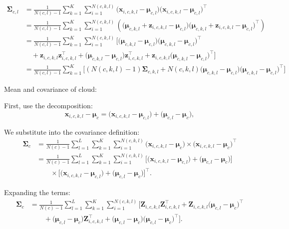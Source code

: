 \documentclass[journal]{IEEEtran}
\begin{document}
\begin{align*}
  \mathbf{\Sigma}_{c,l} &= \frac{1}{N(c,l)-1} \sum_{k=1}^K \sum_{i=1}^{N(c,k,l)} \big( \mathbf{x}_{i,c,k,l} - \mathbf{\mu}_{c,l} \big) \big( \mathbf{x}_{i,c,k,l} - \mathbf{\mu}_{c,l} \big)^\top \\
  &= \frac{1}{N(c,l)-1} \sum_{k=1}^K \sum_{i=1}^{N(c,k,l)} \left( \big( \mathbf{\mu}_{c,k,l} + \mathbf{z}_{i,c,k,l} - \mathbf{\mu}_{c,l} \big) \big( \mathbf{\mu}_{c,k,l} + \mathbf{z}_{i,c,k,l} - \mathbf{\mu}_{c,l} \big)^\top \right) \\
  &= \frac{1}{N(c,l)-1} \sum_{k=1}^K \sum_{i=1}^{N(c,k,l)} \Bigg[ \big( \mathbf{\mu}_{c,k,l} - \mathbf{\mu}_{c,l} \big) \big( \mathbf{\mu}_{c,k,l} - \mathbf{\mu}_{c,l} \big)^\top \\
  &\quad + \mathbf{z}_{i,c,k,l} \mathbf{z}_{i,c,k,l}^\top + \big( \mathbf{\mu}_{c,k,l} - \mathbf{\mu}_{c,l} \big) \mathbf{z}_{i,c,k,l}^\top + \mathbf{z}_{i,c,k,l} \big( \mathbf{\mu}_{c,k,l} - \mathbf{\mu}_{c,l} \big)^\top \Bigg] \\
  &= \frac{1}{N(c,l)-1} \sum_{k=1}^K \Bigg[ (N(c,k,l)-1) \mathbf{\Sigma}_{c,k,l} + N(c,k,l) \big( \mathbf{\mu}_{c,k,l} - \mathbf{\mu}_{c,l} \big) \big( \mathbf{\mu}_{c,k,l} - \mathbf{\mu}_{c,l} \big)^\top \Bigg]
\end{align*}

Mean and covariance of cloud:

First, use the decomposition:
\begin{equation}
\mathbf{x}_{i,c,k,l} - \mathbf{\mu}_c = \big( \mathbf{x}_{i,c,k,l} - \mathbf{\mu}_{c,l} \big) + \big( \mathbf{\mu}_{c,l} - \mathbf{\mu}_c \big),
\end{equation}

We substitute into the covariance definition:
\begin{align*}
\mathbf{\Sigma}_c 
&= \frac{1}{N(c)-1} \sum_{l=1}^L \sum_{k=1}^K \sum_{i=1}^{N(c,k,l)} 
\big( \mathbf{x}_{i,c,k,l} - \mathbf{\mu}_c \big) \nonumber \times 
\big( \mathbf{x}_{i,c,k,l} - \mathbf{\mu}_c \big)^\top \\ 
&= \frac{1}{N(c)-1} \sum_{l=1}^L \sum_{k=1}^K \sum_{i=1}^{N(c,k,l)} 
\Big[
\big( \mathbf{x}_{i,c,k,l} - \mathbf{\mu}_{c,l} \big) + \big( \mathbf{\mu}_{c,l} - \mathbf{\mu}_c \big)
\Big] \nonumber \\
&\qquad \times 
\Big[
\big( \mathbf{x}_{i,c,k,l} - \mathbf{\mu}_{c,l} \big) + \big( \mathbf{\mu}_{c,l} - \mathbf{\mu}_c \big)
\Big]^\top.
\end{align*}

Expanding the terms:
\begin{align}
\mathbf{\Sigma}_c &= \frac{1}{N(c)-1} \sum_{l=1}^L \sum_{k=1}^K \sum_{i=1}^{N(c,k,l)} 
\Big[
\mathbf{Z}_{i,c,k,l} \mathbf{Z}_{i,c,k,l}^\top + 
\mathbf{Z}_{i,c,k,l} \big( \mathbf{\mu}_{c,l} - \mathbf{\mu}_c \big)^\top \nonumber \\
&\qquad + 
\big( \mathbf{\mu}_{c,l} - \mathbf{\mu}_c \big) \mathbf{Z}_{i,c,k,l}^\top + 
\big( \mathbf{\mu}_{c,l} - \mathbf{\mu}_c \big) \big( \mathbf{\mu}_{c,l} - \mathbf{\mu}_c \big)^\top
\Big].
\end{align}
\end{document}
